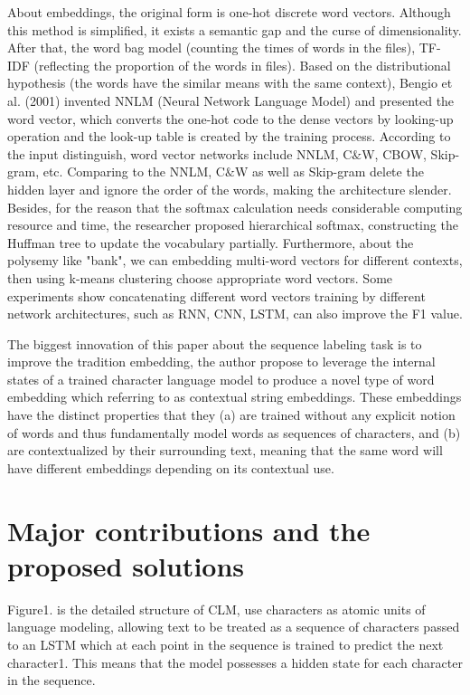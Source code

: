 \documentclass[10pt,twocolumn,letterpaper]{article}
\begin{document}
About embeddings, the original form is one-hot discrete word vectors. Although this method 
is simplified, it exists a semantic gap and the curse of dimensionality. After that, the word bag 
model (counting the times of words in the files), TF-IDF (reflecting the proportion of the words in 
files). Based on the distributional hypothesis (the words have the similar means with the 
same context), Bengio et al. (2001) invented NNLM (Neural Network Language Model) and 
presented the word vector, which converts the one-hot code to the dense vectors by looking-up
operation and the look-up table is created by the training process. According to the input 
distinguish, word vector networks include NNLM, C$\&$W, CBOW, Skip-gram, etc. Comparing to the
NNLM, C$\&$W as well as Skip-gram delete the hidden layer and ignore the order of the words, making the
architecture slender. Besides, for the reason that the softmax calculation needs considerable 
computing resource and time, the researcher proposed hierarchical softmax, constructing the Huffman
tree to update the vocabulary partially. Furthermore, about the polysemy like "bank", we can
embedding multi-word vectors for different contexts, then using k-means clustering choose 
appropriate word vectors. Some experiments show concatenating different word vectors training
by different network architectures, such as RNN, CNN, LSTM, can also improve the F1 value.   

The biggest innovation of this paper about the sequence labeling task is to improve the tradition
embedding, the author propose to leverage the internal states of a trained character language 
model to produce a novel type of word embedding which referring to as contextual string embeddings.
These embeddings have the distinct properties that they (a) are trained without any explicit notion 
of words and thus fundamentally model words as sequences of characters, and (b) are contextualized 
by their surrounding text, meaning that the same word will have different embeddings depending on 
its contextual use.

\section{Major contributions and the proposed solutions}

Figure1. is the detailed structure of CLM,  use characters as atomic units of language modeling, 
allowing text to be treated as a sequence of characters passed to an LSTM which at each point in 
the sequence is trained to predict the next character1. This means that the model possesses a 
hidden state for each character in the sequence.
\end{document}
